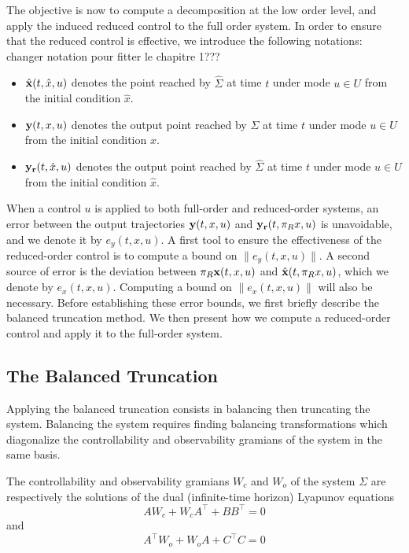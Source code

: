  The objective is now to compute a decomposition at the low order level, 
 and apply the induced reduced control to the full order system.
 In order to ensure that the reduced control is effective, we introduce the following notations:
 {\todo changer notation pour fitter le chapitre 1???}
 \begin{itemize}
  \item ${\hat {\bf x}}(t,\hat x,u)$ denotes the point reached by $\hat \Sigma$ at time
  $t$ under mode $u \in U$ from the initial condition $\hat x$.
  \item ${\bf y}(t,x,u)$ denotes the output point reached by $\Sigma$ at time
  $t$ under mode $u \in U$ from the initial condition $x$.
  \item ${\bf y_r}(t,\hat x,u)$ denotes the output point reached by $\hat \Sigma$ at time
  $t$ under mode $u \in U$ from the initial condition $\hat x$.
  \end{itemize}
 When a control $u$ is applied to both full-order and reduced-order systems, an 
 error between the output trajectories ${\bf y}(t,x,u)$ and ${\bf y_r}(t,\pi_R x,u)$
 is unavoidable, and we denote it by $e_y(t,x,u)$.  
 A first tool to ensure the effectiveness of the reduced-order control is to compute 
 a bound on $\| e_y (t,x,u)\|$.
 A second source of error is the deviation between $ \pi_R {\bf x}(t,x,u)$ and
 $ {\hat {\bf x}}(t,\pi_R x,u)$, which we denote by $e_x(t,x,u)$. Computing
 a bound on $\| e_x(t,x,u) \|$ will also be necessary.
 Before establishing these error bounds, we first briefly describe the balanced truncation
 method. We then present how we compute a reduced-order control
 and apply it to the full-order system.
 
 
 \subsection{The Balanced Truncation}

Applying the balanced truncation consists in balancing then truncating the system.
Balancing the system requires finding bal\-ancing transformations which diagonalize the cont\-rollability and observability gramians of the system in the same basis. 

The controllability and observability gramians $W_c$ and $W_o$ of the system $\Sigma$ are respectively the solutions
of the dual (infinite-time horizon) Lyapunov equations
\begin{equation}
 A W_c + W_c A^\top + B B^\top = 0
\end{equation}
and
\begin{equation}
 A^\top W_o + W_o A + C^\top C = 0
\end{equation}

